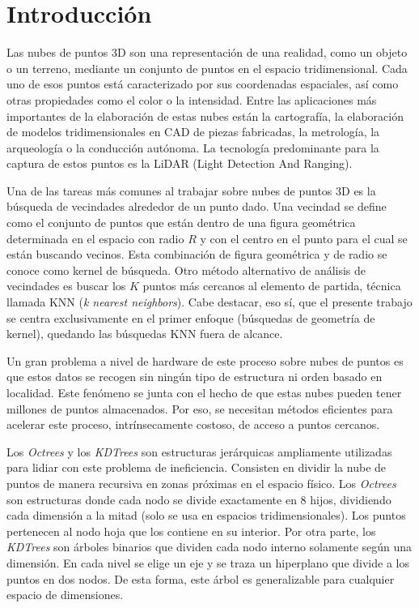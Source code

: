 \chapter{Introducción}

Las nubes de puntos 3D son una representación de una realidad, como un objeto o un terreno, mediante un conjunto de puntos en el espacio tridimensional. Cada uno de esos puntos está caracterizado por sus coordenadas espaciales, así como otras propiedades como el color o la intensidad. Entre las aplicaciones más importantes de la elaboración de estas nubes están la cartografía, la elaboración de modelos tridimensionales en CAD de piezas fabricadas, la metrología, la arqueología o la conducción autónoma.
La tecnología predominante para la captura de estos puntos es la LiDAR (Light Detection And Ranging).

Una de las tareas más comunes al trabajar sobre nubes de puntos 3D es la búsqueda de vecindades alrededor de un punto dado. Una vecindad se define como el conjunto de puntos que están dentro de una figura geométrica determinada en el espacio con radio $R$ y con el centro en el punto para el cual se están buscando vecinos. Esta combinación de figura geométrica y de radio se conoce como kernel de búsqueda. Otro método alternativo de análisis de vecindades es buscar los $K$ puntos más cercanos al elemento de partida, técnica llamada KNN (\textit{k nearest neighbors}). Cabe destacar, eso sí, que el presente trabajo se centra exclusivamente en el primer enfoque (búsquedas de geometría de kernel), quedando las búsquedas KNN fuera de alcance.

Un gran problema a nivel de hardware de este proceso sobre nubes de puntos es que estos datos se recogen sin ningún tipo de estructura ni orden basado en localidad. Este fenómeno se junta con el hecho de que estas nubes pueden tener millones de puntos almacenados. Por eso, se necesitan métodos eficientes para acelerar este proceso, intrínsecamente costoso, de acceso a puntos cercanos.

Los \textit{Octrees} y los \textit{KDTrees} son estructuras jerárquicas ampliamente utilizadas para lidiar con este problema de ineficiencia. Consisten en dividir la nube de puntos de manera recursiva en zonas próximas en el espacio físico. Los \textit{Octrees} son estructuras donde cada nodo se divide exactamente en 8 hijos, dividiendo cada dimensión a la mitad (solo se usa en espacios tridimensionales). Los puntos pertenecen al nodo hoja que los contiene en su interior. Por otra parte, los \textit{KDTrees} son árboles binarios que dividen cada nodo interno solamente según una dimensión. En cada nivel se elige un eje y se traza un hiperplano que divide a los puntos en dos nodos. De esta forma, este árbol es generalizable para cualquier espacio de dimensiones.

